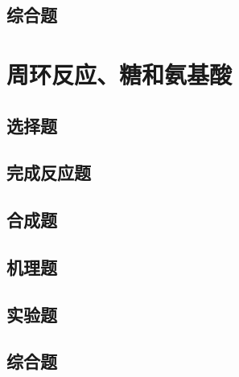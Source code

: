 \documentclass[
  10pt,
  twoside,
  openany,
  b5paper, %
  colorscheme = basic, %
]{qyxf-book}
\begin{document}
\section{综合题}

\chapter{周环反应、糖和氨基酸}

\section{选择题}
\section{完成反应题}
\section{合成题}
\section{机理题}
\section{实验题}
\section{综合题}
\end{document}
